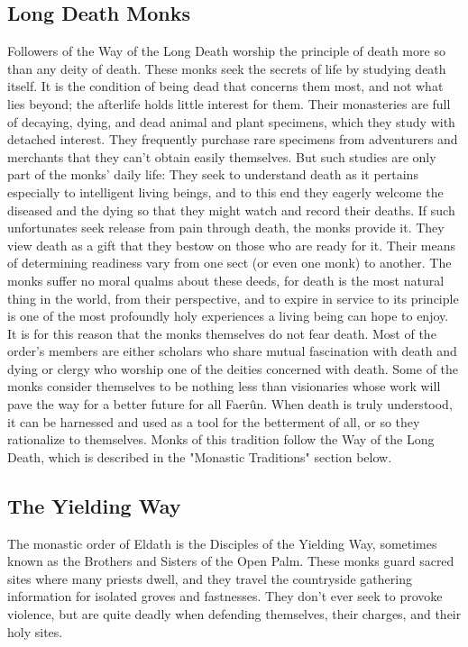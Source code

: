 \documentclass[10pt,a4paper,twoside,twocolumn,openany,bg=print,nodeprecatedcode]{dndbook}
\begin{document}
\subsection{Long Death Monks}
Followers of the Way of the Long Death worship the principle of death more so than any deity of death. These monks seek the secrets of life by studying death itself. It is the condition of being dead that concerns them most, and not what lies beyond; the afterlife holds little interest for them. Their monasteries are full of decaying, dying, and dead animal and plant specimens, which they study with detached interest. They frequently purchase rare specimens from adventurers and merchants that they can't obtain easily themselves. But such studies are only part of the monks' daily life: They seek to understand death as it pertains especially to intelligent living beings, and to this end they eagerly welcome the diseased and the dying so that they might watch and record their deaths. If such unfortunates seek release from pain through death, the monks provide it. They view death as a gift that they bestow on those who are ready for it. Their means of determining readiness vary from one sect (or even one monk) to another.
The monks suffer no moral qualms about these deeds, for death is the most natural thing in the world, from their perspective, and to expire in service to its principle is one of the most profoundly holy experiences a living being can hope to enjoy. It is for this reason that the monks themselves do not fear death.
Most of the order's members are either scholars who share mutual fascination with death and dying or clergy who worship one of the deities concerned with death. Some of the monks consider themselves to be nothing less than visionaries whose work will pave the way for a better future for all Faerûn. When death is truly understood, it can be harnessed and used as a tool for the betterment of all, or so they rationalize to themselves.
Monks of this tradition follow the Way of the Long Death, which is described in the "Monastic Traditions" section below.
\subsection{The Yielding Way}
The monastic order of Eldath is the Disciples of the Yielding Way, sometimes known as the Brothers and Sisters of the Open Palm. These monks guard sacred sites where many priests dwell, and they travel the countryside gathering information for isolated groves and fastnesses. They don't ever seek to provoke violence, but are quite deadly when defending themselves, their charges, and their holy sites.
\end{document}
